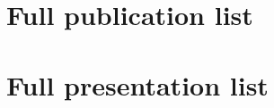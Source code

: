 \pagebreak
\section{Full publication list}\vspace{0.2cm} 



\section{Full presentation list}\vspace{0.2cm} 





